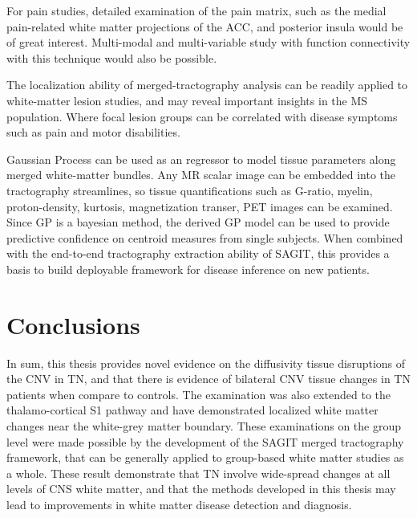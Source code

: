 For pain studies, detailed examination of the pain matrix, such as the medial pain-related white matter projections of the ACC, and posterior insula would be of great interest. Multi-modal and multi-variable study with function connectivity with this technique would also be possible. 

The localization ability of merged-tractography analysis can be readily applied to white-matter lesion studies, and may reveal important insights in the MS population. Where focal lesion groups can be correlated with disease symptoms such as pain and motor disabilities. 

Gaussian Process can be used as an regressor to model tissue parameters along merged white-matter bundles. Any MR scalar image can be embedded into the tractography streamlines, so tissue quantifications such as G-ratio, myelin, proton-density, kurtosis, magnetization transer, PET images can be examined. Since GP is a bayesian method, the derived GP model can be used to provide predictive confidence on centroid measures from single subjects. When combined with the end-to-end tractography extraction ability of SAGIT, this provides a basis to build deployable framework for disease inference on new patients. 

\section{Conclusions}

In sum, this thesis provides novel evidence on the diffusivity tissue disruptions of the CNV in TN, and that there is evidence of bilateral CNV tissue changes in TN patients when compare to controls. The examination was also extended to the thalamo-cortical S1 pathway and have demonstrated localized white matter changes near the white-grey matter boundary. These examinations on the group level were made possible by the development of the SAGIT merged tractography framework, that can be generally applied to group-based white matter studies as a whole. These result demonstrate that TN involve wide-spread changes at all levels of CNS white matter, and that the methods developed in this thesis may lead to improvements in white matter disease detection and diagnosis. 



 

